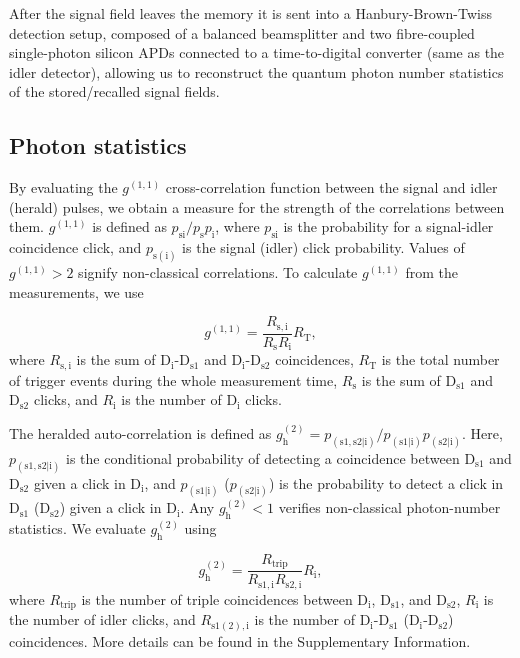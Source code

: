 After the signal field leaves the memory it is sent into a Hanbury-Brown-Twiss detection setup, composed of a balanced beamsplitter and two fibre-coupled single-photon silicon APDs connected to a time-to-digital converter (same as the idler detector), allowing us to reconstruct the quantum photon number statistics of the stored/recalled signal fields.

\subsection*{Photon statistics}
By evaluating the $g^{(1,1)}$ cross-correlation function between the signal and idler (herald) pulses, we obtain a measure for the strength of the correlations between them. $g^{(1,1)}$ is defined as $p_\mathrm{si}/p_\mathrm{s}p_\mathrm{i}$, where $p_\mathrm{si}$ is the probability for a signal-idler coincidence click, and $p_\mathrm{s(i)}$ is the signal (idler) click probability. Values of $g^{(1,1)}>2$ signify non-classical correlations. To calculate $g^{(1,1)}$ from the measurements, we use

\begin{equation}
g^{(1,1)}=\frac{R_\mathrm{s,i}}{R_\mathrm{s}R_\mathrm{i}}R_\mathrm{T},
\end{equation}
where $R_\mathrm{s,i}$ is the sum of $\mathrm{D_{i}}$-$\mathrm{D_{s1}}$ and $\mathrm{D_{i}}$-$\mathrm{D_{s2}}$ coincidences, $R_\mathrm{T}$  is the total number of trigger events during the whole measurement time, $R_\mathrm{s}$ is the sum of $\mathrm{D_{s1}}$ and $\mathrm{D_{s2}}$ clicks, and $R_\mathrm{i}$ is the number of $\mathrm{D_{i}}$ clicks.

The heralded auto-correlation is defined as $g^{(2)}_\mathrm{h}=p_\mathrm{(s1,s2|i)}/p_\mathrm{(s1|i)}p_\mathrm{(s2|i)}$. Here, $p_\mathrm{(s1,s2|i)}$ is the conditional probability of detecting a coincidence between $\mathrm{D_{s1}}$ and $\mathrm{D_{s2}}$ given a click in $\mathrm{D_{i}}$, and $p_\mathrm{(s1|i)}$ ($p_\mathrm{(s2|i)}$) is the probability to detect a click in $\mathrm{D_{s1}}$ ($\mathrm{D_{s2}}$) given a click in $\mathrm{D_{i}}$. Any $g^{(2)}_\mathrm{h}<1$ verifies non-classical photon-number statistics. We evaluate $g^{(2)}_\mathrm{h}$ using

\begin{equation}
g^{(2)}_\mathrm{h}=\frac{R_\mathrm{trip}}{R_\mathrm{s1,i}R_\mathrm{s2,i}}R_\mathrm{i},
\end{equation}
where $R_\mathrm{trip}$ is the number of triple coincidences between $\mathrm{D_{i}}$, $\mathrm{D_{s1}}$, and $\mathrm{D_{s2}}$, $R_\mathrm{i}$ is the number of idler clicks, and $R_\mathrm{s1(2),i}$ is the number of $\mathrm{D_{i}}$-$\mathrm{D_{s1}}$ ($\mathrm{D_{i}}$-$\mathrm{D_{s2}}$) coincidences. More details can be found in the Supplementary Information.

